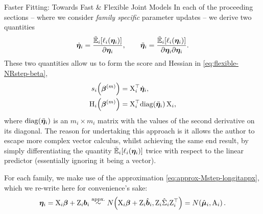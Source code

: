 \begin{chapter}{\label{cha:flexible}Faster Fitting: Towards Fast \& Flexible Joint Models}
In each of the proceeding sections -- where we consider \textit{family specific} parameter updates -- we derive two quantities
\begin{align}
    \dot{\bm{\eta}}_i=\frac{\tilde{\mathbb{E}}_i\!\left[\ell_i\!\left(\bm{\eta}_i\right)\right]}{\partial\bm{\eta}_i},\qquad\ddot{\bm{\eta}}_i=\frac{\tilde{\mathbb{E}}_i\!\left[\ell_i\!\left(\bm{\eta}_i\right)\right]}{\partial\bm{\eta}_i\partial\bm{\eta}_i}.
\label{eq:flexible-tExpi-derivs}
\end{align}
These two quantities allow us to form the score and Hessian in \eqref{eq:flexible-NRstep-beta},
\begin{equation}
    \begin{aligned}
        s_i\!\left(\bm{\beta}^{(m)}\right) &= \mathrm{X}_i^\top\dot{\bm{\eta}}_i,\\
        \mathrm{H}_i\!\left(\bm{\beta}^{(m)}\right) &= \mathrm{X}_i^\top\mathrm{diag}\!\left(\ddot{\bm{\eta}}_i\right)\mathrm{X}_i,
    \end{aligned}
\label{eq:flexible-score-hessian-derivs}
\end{equation}
where $\mathrm{diag}\!\left(\ddot{\bm{\eta}}_i\right)$ is an $m_{i}\times m_{i}$ matrix with the values of the second derivative on its diagonal. The reason for undertaking this approach is it allows the author to escape more complex vector calculus, whilst achieving the same end result, by simply differentiating the quantity $\tilde{\mathbb{E}}_i\!\left[\ell_i\!\left(\bm{\eta}_i\right)\right]$ twice with respect to the linear predictor (essentially ignoring it being a vector).

For each family, we make use of the approximation \eqref{eq:approx-Mstep-longitappx}, which we re-write here for convenience's sake:
\begin{equation}
    \bm{\eta}_i=\mathrm{X}_i\bm{\beta}+\mathrm{Z}_i\bm{b}_i\overset{\text{appx.}}{\sim} N\!\left(\mathrm{X}_i\bm{\beta}+\mathrm{Z}_i\hat{\bm{b}}_i,\mathrm{Z}_i\hat{\Sigma}_i\mathrm{Z}_i^\top\right)=N\!\left(\hat{\bm{\mu}}_i,\mathrm{A}_i\right).
\label{eq:flexible-linp-approx}
\end{equation}

\end{chapter}
